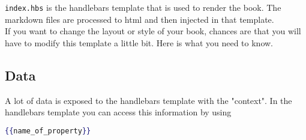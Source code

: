 \documentclass{article}
\begin{document}
\lstinline|index.hbs| is the handlebars template that is used to render the book. The
markdown files are processed to html and then injected in that template.\\

If you want to change the layout or style of your book, chances are that you
will have to modify this template a little bit. Here is what you need to know.\\

\subsection{Data}
\label{Data}
\label{data}

A lot of data is exposed to the handlebars template with the "context". In the
handlebars template you can access this information by using\\
\begin{lstlisting}[language=handlebars]
{{name_of_property}}

\end{lstlisting}
\end{document}
